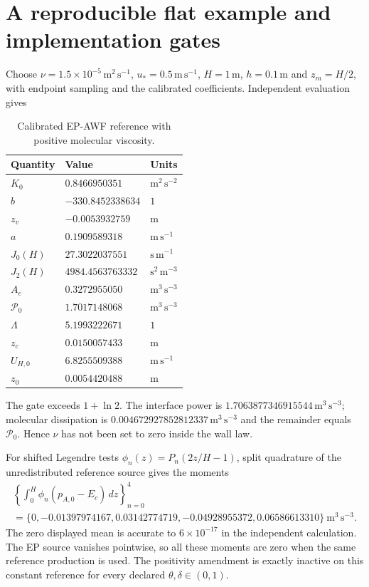 \documentclass[11pt,a4paper]{article}
\numberwithin{equation}{section}
\begin{document}
\section{A reproducible flat example and implementation gates}
\label{sec:wj-wall-example}

Choose $\nu=1.5\times10^{-5}\,\mathrm{m^2\,s^{-1}}$,
$u_*=0.5\,\mathrm{m\,s^{-1}}$, $H=1\,\mathrm m$,
$h=0.1\,\mathrm m$ and $z_m=H/2$, with endpoint sampling and the
calibrated coefficients. Independent evaluation gives
\begin{table}[htbp]
\centering\small
\begin{tabular}{@{}lll@{}}
\toprule
Quantity & Value & Units\\
\midrule
$K_0$ & $0.8466950351$ & $\mathrm{m^2\,s^{-2}}$\\
$b$ & $-330.8452338634$ & $1$\\
$z_v$ & $-0.0053932759$ & $\mathrm m$\\
$a$ & $0.1909589318$ & $\mathrm{m\,s^{-1}}$\\
$J_0(H)$ & $27.3022037551$ & $\mathrm{s\,m^{-1}}$\\
$J_2(H)$ & $4984.4563763332$ & $\mathrm{s^2\,m^{-3}}$\\
$A_e$ & $0.3272955050$ & $\mathrm{m^3\,s^{-3}}$\\
$\mathcal P_0$ & $1.7017148068$ & $\mathrm{m^3\,s^{-3}}$\\
$\Lambda$ & $5.1993222671$ & $1$\\
$z_c$ & $0.0150057433$ & $\mathrm m$\\
$U_{H,0}$ & $6.8255509388$ & $\mathrm{m\,s^{-1}}$\\
$z_0$ & $0.0054420488$ & $\mathrm m$\\
\bottomrule
\end{tabular}
\caption{Calibrated EP-AWF reference with positive molecular viscosity.}
\label{tab:ep-reference}
\end{table}
The gate exceeds $1+\ln2$. The interface power is
$1.7063877346915544\,\mathrm{m^3\,s^{-3}}$; molecular dissipation is
$0.004672927852812337\,\mathrm{m^3\,s^{-3}}$ and the remainder equals
$\mathcal P_0$. Hence $\nu$ has not been set to zero inside the wall law.

For shifted Legendre tests $\phi_n(z)=P_n(2z/H-1)$, split quadrature
of the unredistributed reference source gives the moments
\begin{equation}
 \begin{gathered}
 \left\{\int_0^H\phi_n(p_{A,0}-E_c)\,dz\right\}_{n=0}^4\\
 =\{0,-0.01397974167,0.03142774719,-0.04928955372,0.06586613310\}
 \ \mathrm{m^3\,s^{-3}}.
 \end{gathered}
\end{equation}
The zero displayed mean is accurate to $6\times10^{-17}$ in the
independent calculation. The EP source vanishes pointwise, so all these
moments are zero when the same reference production is used. The
positivity amendment is exactly inactive on this constant reference
for every declared $\theta,\delta\in(0,1)$.
\end{document}
